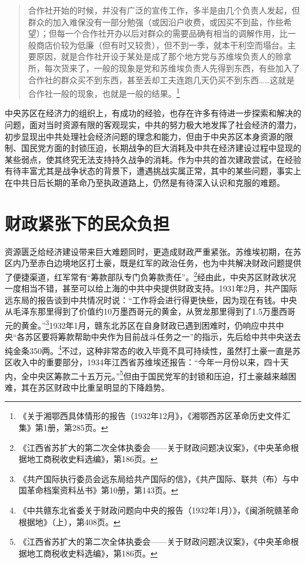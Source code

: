 \begin{quote}

合作社开始的时候，并没有广泛的宣传工作，多半是由几个负责人发起，但群众的加入难保没有一部分勉强（或因沿户收费，或因买不到盐，作些希望）；但每一个合作社开办以后对群众的需要品确有相当的调解作用，比一般商店价较为低廉（但有时又较贵），但不到一季，就本干利空而塌台。主要原因，就是合作社开设于某处是成了那个地方党与苏维埃负责人的赊拿所，每次货来了，一般的现象是党和苏维埃负责人先得到东西，有些加入了合作社的群众买不到东西，甚至丢却工夫连跑几天仍买不到东西……这就是合作社一般的现象，也就是一般的结果。\footnote{《关于湘鄂西具体情形的报告（1932年12月》，《湘鄂西苏区革命历史文件汇集》第1册，第285页。}
\end{quote}


中央苏区在经济力的组织上，有成功的经验，也存在许多有待进一步探索和解决的问题，面对当时资源有限的客观现实，中共的努力极大地发挥了社会经济的潜力，初步显现出中共处理社会经济问题的理念和能力，但由于中央苏区本身资源的限制、国民党方面的封锁压迫，长期战争的巨大消耗及中共在经济建设过程中显现的某些弱点，使其终究无法支持持久战争的消耗。作为中共的首次建政尝试，在经验有待丰富尤其是战争状态的背景下，遭遇挑战实属正常，其中的某些问题，事实上在中共日后长期的革命乃至执政道路上，仍然是有待深入认识和克服的难题。

\section{财政紧张下的民众负担}


资源匮乏给经济建设带来巨大难题同时，更造成财政严重紧张。苏维埃初期，在苏区内乃至赤白边境地区打土豪，既是红军的政治任务，也为中共解决财政问题提供了便捷渠道，红军常有“筹款部队专门负筹款责任”。\footnote{《江西省苏扩大的第二次全体执委会——关于财政问题决议案》，《中央革命根据地工商税收史料选编》，第186页。}经由此，中央苏区财政状况一度相当不错，甚至可以给上海的中共中央提供财政支持。1931年2月，共产国际远东局的报告谈到中共情况时说：“工作将会进行得更快些，因为现在有钱。中央从毛泽东那里得到了价值约10万墨西哥元的黄金，从贺龙那里得到了1.5万墨西哥元的黄金。”\footnote{《共产国际执行委员会远东局给共产国际的信》，《共产国际、联共（布）与中国革命档案资料丛书》第10册，第143页。}1932年1月，赣东北苏区在自身财政已遇到困难时，仍响应中共中央“各苏区要将筹款帮助中央作为目前战斗任务之一”的指示，先后给中共中央送去纯金条350两。\footnote{《中共赣东北省委关于财政问题向中央的报告（1932年1月）》，《闽浙皖赣革命根据地》（上），第408页。}不过，这种非常态的收入毕竟不具可持续性，虽然打土豪一直是苏区收入中的重要部分，1934年江西省苏维埃还报告：“今年一月份以来，四十天内，全中央区筹款二十五万元。”\footnote{《江西省苏扩大的第二次全体执委会——关于财政问题决议案》，《中央革命根据地工商税收史料选编》，第186页。}但由于国民党军的封锁和压迫，打土豪越来越困难，其在苏区财政中比重呈明显的下降趋势。



